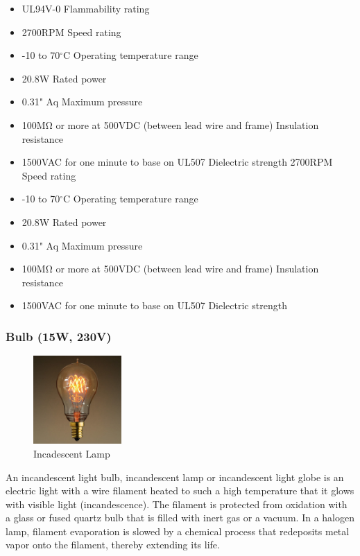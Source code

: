 \begin{itemize}
\item UL94V-0 Flammability rating

\item	2700RPM Speed rating
\item	-10 to 70$^\circ$C Operating temperature range
\item	20.8W Rated power
\item	0.31" Aq Maximum pressure
\item	100M{\si\ohm} or more at 500VDC (between lead wire and frame) Insulation resistance
\item	1500VAC for one minute to base on UL507 Dielectric strength
2700RPM Speed rating
\item	-10 to 70$^\circ$C Operating temperature range
\item 20.8W Rated power
\item 0.31" Aq Maximum pressure
\item	100M{\si\ohm} or more at 500VDC (between lead wire and frame) Insulation resistance
\item	1500VAC for one minute to base on UL507 Dielectric strength

\end{itemize}
\subsubsection{Bulb (15W, 230V)} 

\begin{figure}
	\includegraphics[width=0.3\textwidth]{photos/theory/bulb.jpg}
	\caption{Incadescent Lamp}
\end{figure}

An incandescent light bulb, incandescent lamp or incandescent light globe is an electric light with a wire filament heated to such a high temperature that it glows with visible light (incandescence). The filament is protected from oxidation with a glass or fused quartz bulb that is filled with inert gas or a vacuum. In a halogen lamp, filament evaporation is slowed by a chemical process that redeposits metal vapor onto the filament, thereby extending its life.\\

